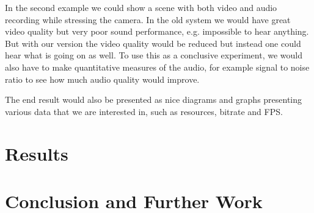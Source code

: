 \documentclass[nobiblatex]{LTHthesis}
\begin{document}
In the second example we could show a scene with both video and audio recording while stressing the camera. In the old system we would have great video quality but very poor sound performance, e.g. impossible to hear anything. But with our version the video quality would be reduced but instead one could hear what is going on as well. To use this as a conclusive experiment, we would also have to make quantitative measures of the audio, for example signal to noise ratio to see how much audio quality would improve.

The end result would also be presented as nice diagrams and graphs presenting various data that we are interested in, such as resources, bitrate and FPS.

\chapter{Results}

\chapter{Conclusion and Further Work}





\end{document}
